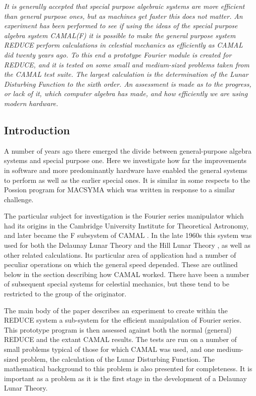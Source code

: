 
\emph{It is generally accepted that special purpose algebraic systems
are more efficient than general purpose ones, but as machines get
faster this does not matter.  An experiment has been performed to see
if using the ideas of the special purpose algebra system CAMAL(F) it
is possible to make the general purpose system REDUCE perform
calculations in celestial mechanics as efficiently as CAMAL did twenty
years ago.  To this end a prototype Fourier module is created for
REDUCE, and it is tested on some small and medium-sized problems taken
from the CAMAL test suite. The largest calculation is the
determination of the Lunar Disturbing Function to the sixth order.  An
assessment is made as to the progress, or lack of it, which computer
algebra has made, and how efficiently we are using modern hardware.
}


\subsection{Introduction}

A number of years ago there emerged the divide between general-purpose
algebra systems and special purpose one.  Here we investigate how far
the improvements in software and more predominantly hardware have
enabled the general systems to perform as well as the earlier special
ones.  It is similar in some respects to the Possion program for
MACSYMA \cite{Fateman:74a} which was written in response to a similar
challenge.

The particular subject for investigation is the Fourier series
manipulator which had its origins in the Cambridge University
Institute for Theoretical Astronomy, and later became the F subsystem
of CAMAL \cite{Barton67b,CAMALF:83}.  In the late 1960s this system was
used for both the Delaunay Lunar Theory \cite{Delaunay:1860,Barton67a} and
the Hill Lunar Theory \cite{Bourne:72}, as well as other related
calculations.  Its particular area of application had a number of
peculiar operations on which the general speed depended.  These are
outlined below in the section describing how CAMAL worked.  There have
been a number of subsequent special systems for celestial mechanics,
but these tend to be restricted to the group of the originator.

The main body of the paper describes an experiment to create within
the REDUCE system a sub-system for the efficient manipulation of
Fourier series.  This prototype program is then assessed against both
the normal (general) REDUCE and the extant CAMAL results.  The tests
are run on a number of small problems typical of those for which CAMAL
was used, and one medium-sized problem, the calculation of the Lunar
Disturbing Function.  The mathematical background to this problem is
also presented for completeness.  It is important as a problem as it
is the first stage in the development of a Delaunay Lunar Theory.

